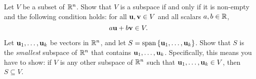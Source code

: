 \begin{enumialphparenastyle}
\begin{ex}
  Let $V$ be a subset of $\mathbb{R}^n$. Show that $V$ is a subspace if and
  only if it is non-empty and the following condition holds: for all
  $\mbox{\bf u},\mbox{\bf v}\in V$ and all scalars $a,b\in\mathbb{R}$,
  \begin{equation*}
    a\mbox{\bf u} + b\mbox{\bf v} \in V.
  \end{equation*}
\end{ex}

\begin{ex}
  Let $\mbox{\bf u}_1,\ldots,\mbox{\bf u}_k$ be vectors in $\mathbb{R}^n$, and let
  $S=\sspan\set{\vect{u}_1,\ldots,\vect{u}_k}$. Show that $S$ is the
  {\em smallest} subspace of $\mathbb{R}^n$ that contains
  $\mbox{\bf u}_1,\ldots,\mbox{\bf u}_k$.  Specifically, this means you have
  to show: if $V$ is any other subspace of $\mathbb{R}^n$ such that
  $\mbox{\bf u}_1,\ldots,\mbox{\bf u}_k\in V$, then $S\subseteq V$.
\end{ex}

\end{enumialphparenastyle}

